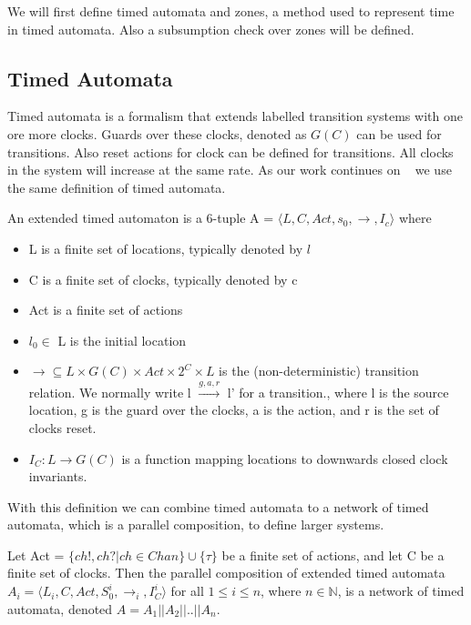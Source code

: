 We will first define timed automata and zones, a method used to represent time in timed automata. Also a subsumption check over zones will be defined. 

\subsection{Timed Automata}
Timed automata is a formalism that extends labelled transition systems with one ore more clocks. Guards over these clocks, denoted as $G(C)$ can be used for transitions. Also reset actions for clock can be defined for transitions. All clocks in the system will increase at the same rate. As our work continues on ~\cite{eemcs21972} we use the same definition of timed automata.

\begin{mydef}
\label{def:TA}
An extended timed automaton is a 6-tuple A = $\langle L, C, Act, s_0, \rightarrow, I_c\rangle$ where
{\renewcommand\labelitemi{--}
	\begin{itemize}
		\item L is a finite set of locations, typically denoted by $l$
		\item C is a finite set of clocks, typically denoted by c
		\item Act is a finite set of actions
		\item $l_0 \in$ L is the initial location
		\item $\rightarrow \subseteq L \times G(C) \times Act \times 2^C \times L$ is the (non-deterministic) transition relation. We normally write l $\stackrel{g,a,r}{\longrightarrow}$ l' for a transition., where l is the source location, g is the guard over the clocks, a is the action, and r is the set of clocks reset.
		\item $I_C : L \rightarrow G(C)$ is a function mapping locations to downwards closed clock invariants.
	\end{itemize}
}
\end{mydef}

With this definition we can combine timed automata to a network of timed automata, which is a parallel composition, to define larger systems.

\begin{mydef}
\label{def:networkTA}
Let Act = $\{ch!,ch?|ch \in Chan\} \cup \{\tau\}$ be a finite set of actions, and let C be a finite set of clocks. Then the parallel composition of extended timed automata $A_i = \langle L_i, C, Act, S^i_0, \rightarrow_{i}, I^i_C\rangle$ for all $1 \leq i \leq n$, where $n \in \mathbb{N}$, is a network of timed automata, denoted $A = A_1||A_2||..||A_n$.
\end{mydef}

